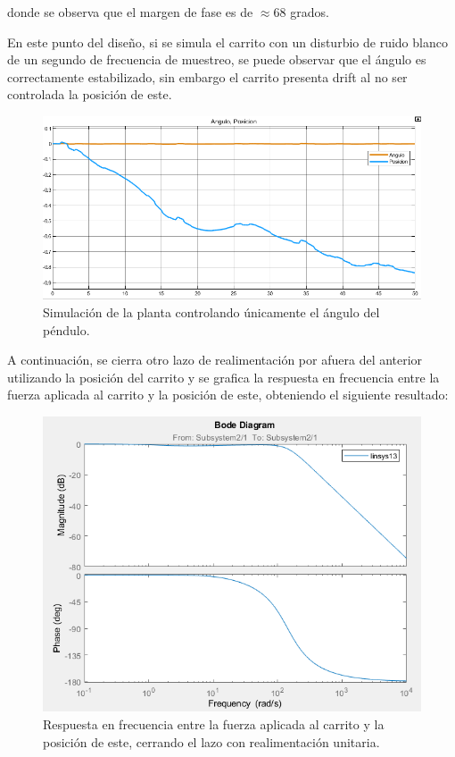 donde se observa que el margen de fase es de $\approx 68$ grados.

En este punto del diseño, si se simula el carrito con un disturbio de ruido blanco de un segundo de frecuencia de muestreo, se puede observar que el ángulo es correctamente estabilizado, sin embargo el carrito presenta drift al no ser controlada la posición de este.

\begin{figure}[H]
	\centering
	\includegraphics[width=0.8\linewidth]{Imagenes/loopshaping/simulacion_solo_angulo}
	\caption{Simulación de la planta controlando únicamente el ángulo del péndulo.}
	\label{simulacion_solo_angulo}
\end{figure}

A continuación, se cierra otro lazo de realimentación por afuera del anterior utilizando la posición del carrito y se grafica la respuesta en frecuencia entre la fuerza aplicada al carrito y la posición de este, obteniendo el siguiente resultado:

\begin{figure}[H]
	\centering
	\includegraphics[width=0.8\linewidth]{Imagenes/loopshaping/bode_cerrando_p}
	\caption{Respuesta en frecuencia entre la fuerza aplicada al carrito y la posición de este, cerrando el lazo con realimentación unitaria.}
	\label{bode_cerrando_p}
\end{figure}


